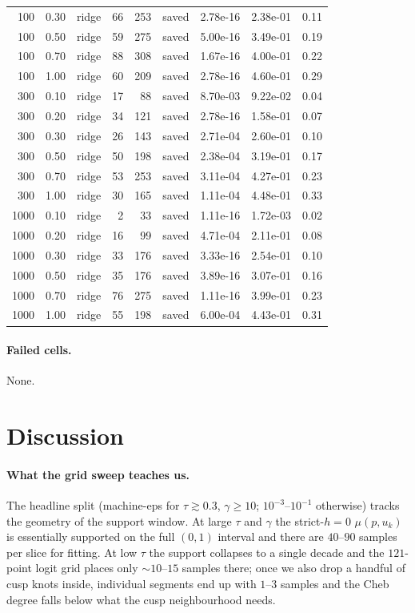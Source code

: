 \documentclass[11pt]{article}
\begin{document}
\begin{longtable}{r r r r r r r r r}
100 & 0.30 & ridge & 66 & 253 & saved & 2.78e-16 & 2.38e-01 & 0.11 \\
100 & 0.50 & ridge & 59 & 275 & saved & 5.00e-16 & 3.49e-01 & 0.19 \\
100 & 0.70 & ridge & 88 & 308 & saved & 1.67e-16 & 4.00e-01 & 0.22 \\
100 & 1.00 & ridge & 60 & 209 & saved & 2.78e-16 & 4.60e-01 & 0.29 \\
300 & 0.10 & ridge & 17 & 88 & saved & 8.70e-03 & 9.22e-02 & 0.04 \\
300 & 0.20 & ridge & 34 & 121 & saved & 2.78e-16 & 1.58e-01 & 0.07 \\
300 & 0.30 & ridge & 26 & 143 & saved & 2.71e-04 & 2.60e-01 & 0.10 \\
300 & 0.50 & ridge & 50 & 198 & saved & 2.38e-04 & 3.19e-01 & 0.17 \\
300 & 0.70 & ridge & 53 & 253 & saved & 3.11e-04 & 4.27e-01 & 0.23 \\
300 & 1.00 & ridge & 30 & 165 & saved & 1.11e-04 & 4.48e-01 & 0.33 \\
1000 & 0.10 & ridge & 2 & 33 & saved & 1.11e-16 & 1.72e-03 & 0.02 \\
1000 & 0.20 & ridge & 16 & 99 & saved & 4.71e-04 & 2.11e-01 & 0.08 \\
1000 & 0.30 & ridge & 33 & 176 & saved & 3.33e-16 & 2.54e-01 & 0.10 \\
1000 & 0.50 & ridge & 35 & 176 & saved & 3.89e-16 & 3.07e-01 & 0.16 \\
1000 & 0.70 & ridge & 76 & 275 & saved & 1.11e-16 & 3.99e-01 & 0.23 \\
1000 & 1.00 & ridge & 55 & 198 & saved & 6.00e-04 & 4.43e-01 & 0.31 \\
\bottomrule
\end{longtable}
\paragraph{Failed cells.} None.
\section{Discussion}
\paragraph{What the grid sweep teaches us.} The headline split (machine-eps for $\tau \gtrsim 0.3$, $\gamma \geq 10$; $10^{-3}$--$10^{-1}$ otherwise) tracks the geometry of the support window.  At large $\tau$ and $\gamma$ the strict-$h{=}0$ $\mu(p, u_k)$ is essentially supported on the full $(0, 1)$ interval and there are $40$--$90$ samples per slice for fitting.  At low $\tau$ the support collapses to a single decade and the $121$-point logit grid places only $\sim 10$--$15$ samples there; once we also drop a handful of cusp knots inside, individual segments end up with $1$--$3$ samples and the Cheb degree falls below what the cusp neighbourhood needs.
\end{document}
